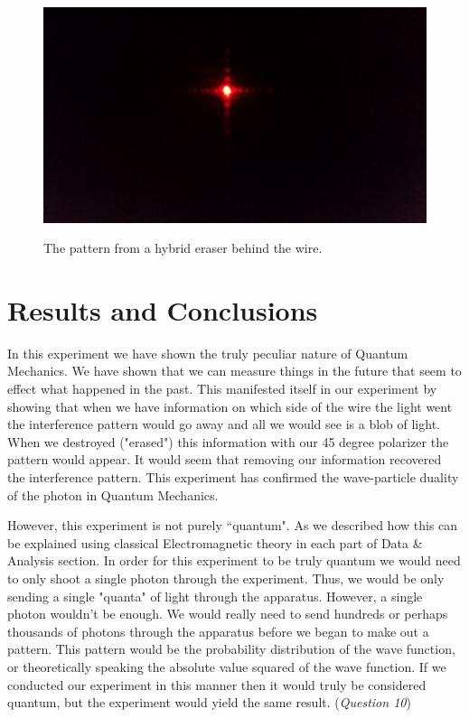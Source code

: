 \documentclass[12pt letterpaper]{article}
\begin{document}
\begin{figure}[H]
  \caption{The pattern from a hybrid eraser behind the wire.}
  \centering
    \includegraphics[width=.75\textwidth]{hybrid_eraser.jpg}
    \label{fig:hybrid}
\end{figure}



\section*{Results and Conclusions}

In this experiment we have shown the truly peculiar nature of Quantum Mechanics. We have shown that we can measure things in the future that seem to effect what happened in the past. This manifested itself in our experiment by showing that when we have information on which side of the wire the light went the interference pattern would go away and all we would see is a blob of light. When we destroyed ("erased") this information with our 45 degree polarizer the pattern would appear. It would seem that removing our information recovered the interference pattern. This experiment has confirmed the wave-particle duality of the photon in Quantum Mechanics. 

However, this experiment is not purely ``quantum". As we described how this can be explained using classical Electromagnetic theory in each part of Data \& Analysis section. In order for this experiment to be truly quantum we would need to only shoot a single photon through the experiment. Thus, we would be only sending a single "quanta" of light through the apparatus. However, a single photon wouldn't be enough. We would really need to send hundreds or perhaps thousands of photons through the apparatus before we began to make out a pattern. This pattern would be the probability distribution of the wave function, or theoretically speaking the absolute value squared of the wave function. If we conducted our experiment in this manner then it would truly be considered quantum, but the experiment would yield the same result. 
(\textit{Question 10})
\end{document}
